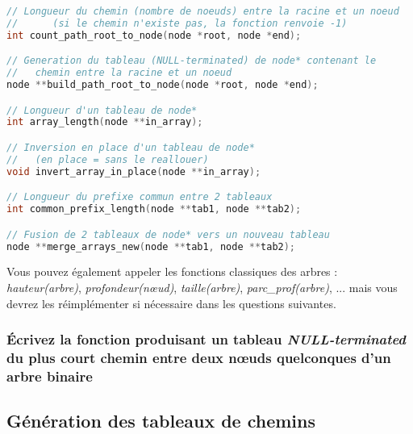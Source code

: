\documentclass[11pt,a4paper]{article}
\begin{document}
\begin{center}
\begin{lstlisting}[language=C,commentstyle=\color{teal}\ttfamily,morekeywords={node}]
// Longueur du chemin (nombre de noeuds) entre la racine et un noeud
//      (si le chemin n'existe pas, la fonction renvoie -1)
int count_path_root_to_node(node *root, node *end);

// Generation du tableau (NULL-terminated) de node* contenant le
//   chemin entre la racine et un noeud
node **build_path_root_to_node(node *root, node *end);

// Longueur d'un tableau de node*
int array_length(node **in_array);

// Inversion en place d'un tableau de node*
//   (en place = sans le reallouer)
void invert_array_in_place(node **in_array);

// Longueur du prefixe commun entre 2 tableaux
int common_prefix_length(node **tab1, node **tab2);

// Fusion de 2 tableaux de node* vers un nouveau tableau
node **merge_arrays_new(node **tab1, node **tab2);
\end{lstlisting}
\end{center}

\vspace*{-0.5cm}

Vous pouvez également appeler les fonctions classiques des arbres : \textit{hauteur(arbre)}, \textit{profondeur(nœud)}, \textit{taille(arbre)}, \textit{parc\_prof(arbre)}, ... mais vous devrez les réimplémenter si nécessaire dans les questions suivantes.


\bigskip


\subsubsection{\'Ecrivez la fonction produisant un tableau \textit{NULL-terminated} du plus court chemin entre deux nœuds quelconques d'un arbre binaire}




\clearpage


\subsection{Génération des tableaux de chemins}
\end{document}
